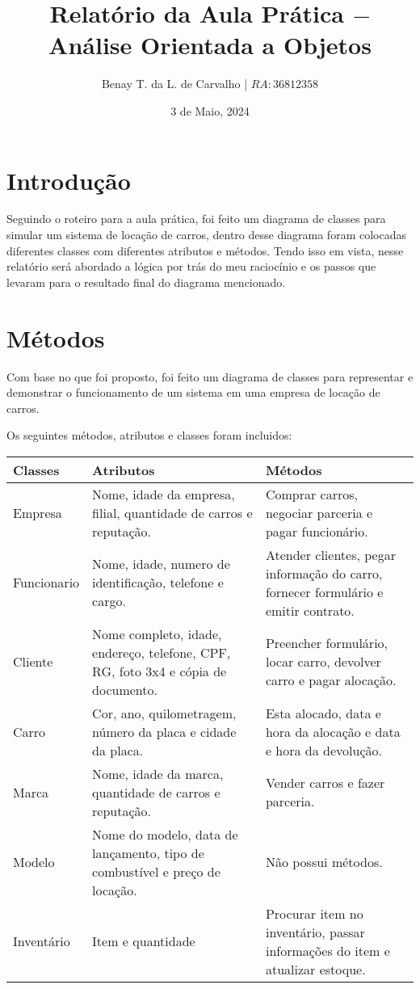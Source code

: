 \documentclass{report}
\title{Relatório da Aula Prática $-$ Análise Orientada a Objetos}
\author{Benay T. da L. de Carvalho | $RA: 36812358$}
\date{3 de Maio, 2024}
\begin{document}
\maketitle

\thispagestyle{headings}
\indent
\section{Introdução}
Seguindo o roteiro para a aula prática, foi feito um diagrama de classes
para simular um sistema de locação de carros, dentro desse diagrama foram
colocadas diferentes classes com diferentes atributos e métodos. Tendo isso
em vista, nesse relatório será abordado a lógica por trás do meu raciocínio 
e os passos que levaram para o resultado final do diagrama mencionado.

\indent
\section{Métodos}
Com base no que foi proposto, foi feito um diagrama de classes
para representar e demonstrar o funcionamento de um sistema em uma 
empresa de locação de carros. 

Os seguintes métodos, atributos e classes foram incluidos:

\begin{center}
    \begin{table}[h]
        \begin{tabular}{  l  p{6cm}  p{6cm} }
            \toprule
\textbf{Classes}      
& \textbf{Atributos}   
& \textbf{Métodos} \\\midrule
Empresa
& Nome, idade da empresa, filial, quantidade de carros e reputação.
& Comprar carros, negociar parceria e pagar funcionário.\\ \hline
Funcionario      
& Nome, idade, numero de identificação, telefone e cargo.                         
& Atender clientes, pegar informação do carro, fornecer formulário e emitir contrato.\\ \hline
Cliente
& Nome completo, idade, endereço, telefone, CPF, RG, foto 3x4 e cópia de documento.
& Preencher formulário, locar carro, devolver carro e pagar alocação. \\\hline
Carro     
& Cor, ano, quilometragem, número da placa e cidade da placa. 
& Esta alocado, data e hora da alocação e data e hora da devolução. \\ \hline
Marca
& Nome, idade da marca, quantidade de carros e reputação.
& Vender carros e fazer parceria. \\ \hline
Modelo
& Nome do modelo, data de lançamento, tipo de combustível e preço de locação.
& Não possui métodos. \\ \hline
Inventário
& Item e quantidade
& Procurar item no inventário, passar informações do item e atualizar estoque. \\
            \bottomrule
        \end{tabular}
    \end{table}
\end{center}
\end{document}
